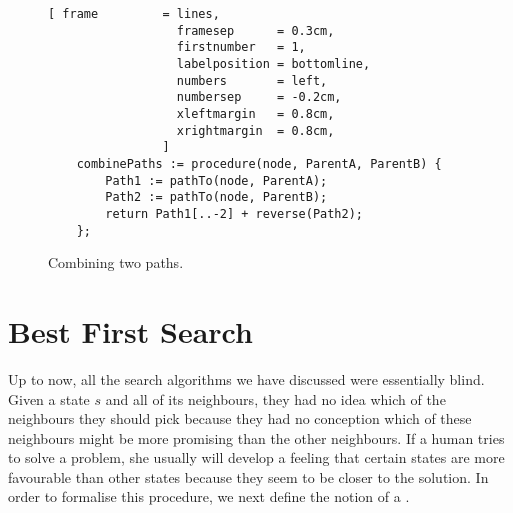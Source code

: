 \begin{figure}[!ht]
\centering
\begin{Verbatim}[ frame         = lines, 
                  framesep      = 0.3cm, 
                  firstnumber   = 1,
                  labelposition = bottomline,
                  numbers       = left,
                  numbersep     = -0.2cm,
                  xleftmargin   = 0.8cm,
                  xrightmargin  = 0.8cm,
                ]
    combinePaths := procedure(node, ParentA, ParentB) {
        Path1 := pathTo(node, ParentA);
        Path2 := pathTo(node, ParentB);
        return Path1[..-2] + reverse(Path2);
    };
\end{Verbatim}
\vspace*{-0.3cm}
\caption{Combining two paths.}
\label{fig:combine-paths.stlx}
\end{figure}
\pagebreak

\section{Best First Search}
Up to now, all the search algorithms we have discussed were essentially blind.  Given a state $s$ and
all of its neighbours, they had no idea which of the neighbours they should pick because they had no conception
which of these neighbours might be more promising than the other neighbours.  If a human tries to solve a
problem, she usually will develop a feeling that certain states are more favourable than other states because
they seem to be closer to the solution.  In order to formalise this procedure, we next define the notion of a 
.
\pagebreak


